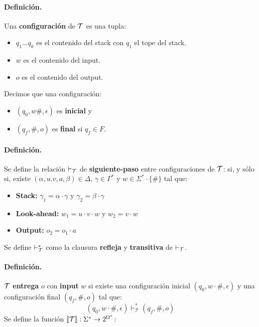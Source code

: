     \paragraph{Definición.} Una \textbf{configuración} de $\mathcal{T}$ es una tupla:
    \begin{itemize}
        \item $q_1\ldots q_k$ es el contenido del stack con $q_1$ el tope del stack.
        \item $w$ es el contenido del input.
        \item $o$ es el contenido del output.
    \end{itemize}
    Decimos que una configuración:
    \begin{itemize}
        \item $(q_0, w\#, \epsilon)$ es \textbf{inicial} y
        \item $(q_f, \#, o)$ es \textbf{final} si $q_f \in F$.
    \end{itemize}

    \paragraph{Definición.} Se define la relación $\vdash_{\mathcal{T}}$ de \textbf{siguiente-paso} entre configuraciones de $\mathcal{T}$:
    si, y sólo si, existe $(\alpha,u.v,a,\beta) \in \Delta$, $\gamma \in \Gamma^*$ y $w \in \Sigma^* \cdot \{\#\}$ tal que:
    \begin{itemize}
        \item \textbf{Stack:} $\gamma_1 = \alpha \cdot \gamma$ y $\gamma_2 = \beta \cdot \gamma$
        \item \textbf{Look-ahead:} $w_1 = u \cdot v \cdot w$ y $w_2 = v \cdot w$
        \item \textbf{Output:} $o_2 = o_1 \cdot a$
    \end{itemize}
    Se define $\vdash_{\mathcal{T}}^*$ como la clausura \textbf{refleja} y \textbf{transitiva} de $\vdash_{\mathcal{T}}$.

    \paragraph{Definición.} $\mathcal{T}$ \textbf{entrega} $o$ con \textbf{input} $w$ si existe una configuración inicial $(q_0, w\cdot \#, \epsilon)$ y una configuración final $(q_f, \#, o)$ tal que:
    $$
        \left(q_0, w \cdot \#, \epsilon\right) \vdash_{\mathcal{T}}^*\left(q_f, \#, o\right)
    $$
    Se define la función $\llbracket \mathcal{T} \rrbracket: \Sigma^* \to 2^{\Omega^*}$:

